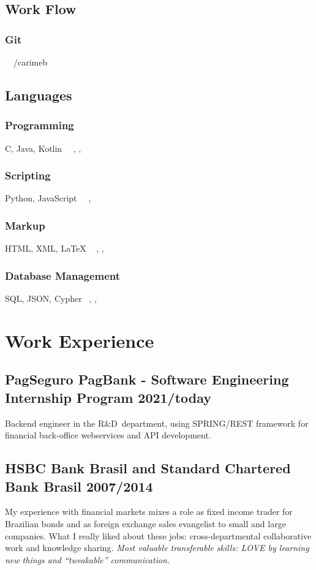 \documentclass{article}
\begin{document}
\subsection[]{Work Flow}
\subsubsection{Git}
\faGithub \  \ /carimeb

\subsection{Languages}
\subsubsection{Programming}
C, Java, Kotlin\   \    , ,  

\subsubsection{Scripting}
Python, JavaScript\   \    , 

\subsubsection{Markup}
HTML, XML, {\LaTeX}   \    , ,  

\subsubsection{Database Management}
SQL, JSON, Cypher   \   , , 

\section{Work Experience}
\subsection{PagSeguro PagBank - Software Engineering Internship Program \hfill 2021/today}
Backend engineer in the R\&D\ department, using SPRING/REST framework
for financial back-office webservices and API development.

\subsection{HSBC Bank Brasil and Standard Chartered Bank Brasil  \hfill 2007/2014}
My experience with financial markets mixes a role as fixed income trader for Brazilian bonds and 
as foreign exchange sales evangelist to small and large companies. 
What I really liked about these jobs: cross-departmental collaborative work and knowledge sharing.
\emph{Most valuable transferable skills: LOVE by learning new things and ``tweakable'' communication.}
\end{document}
